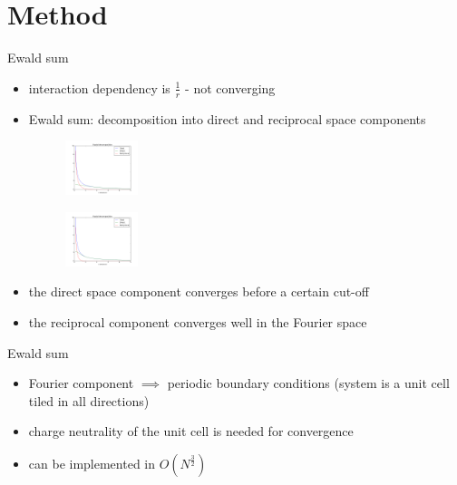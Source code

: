 \documentclass[11pt]{beamer}
\begin{document}
\section{Method}
\begin{frame}{Ewald sum}
\begin{itemize}
\item interaction dependency is $\frac{1}{r}$ - not converging
\item Ewald sum: decomposition into direct and reciprocal space components

\FloatBarrier
\begin{figure} 
    \includegraphics[width=0.2\textwidth]{pics/cutoff1.png}
\end{figure}
\begin{figure} 
    \includegraphics[width=0.2\textwidth]{pics/cutoff2.png}
\end{figure}
\FloatBarrier
\item the direct space component converges before a certain cut-off
\item the reciprocal component converges well in the Fourier space
\end{itemize}
\end{frame}

\begin{frame}{Ewald sum}
\begin{itemize}
\item Fourier component $\implies$ periodic boundary conditions (system is a unit cell tiled in all directions)
\item charge neutrality of the unit cell is needed for convergence
\item can be implemented in $O(N^\frac{3}{2})$

\end{itemize}
\end{frame}
\end{document}
